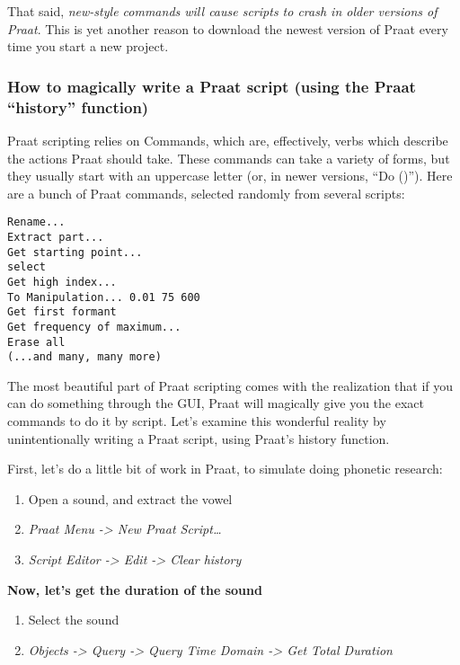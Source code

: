 \documentclass[11pt]{article}
\def\tightlist{}
\begin{document}
That said, \emph{new-style commands will cause scripts to crash in older
versions of Praat}. This is yet another reason to download the newest
version of Praat every time you start a new project.

\hypertarget{how-to-magically-write-a-praat-script-using-the-praat-history-function}{%
\subsubsection{How to magically write a Praat script (using the Praat
``history''
function)}\label{how-to-magically-write-a-praat-script-using-the-praat-history-function}}

Praat scripting relies on Commands, which are, effectively, verbs which
describe the actions Praat should take. These commands can take a
variety of forms, but they usually start with an uppercase letter (or,
in newer versions, ``Do ()''). Here are a bunch of Praat commands,
selected randomly from several scripts:

\begin{verbatim} 
Rename...
Extract part...
Get starting point...
select
Get high index...
To Manipulation... 0.01 75 600
Get first formant
Get frequency of maximum...
Erase all
(...and many, many more)
\end{verbatim}

The most beautiful part of Praat scripting comes with the realization
that if you can do something through the GUI, Praat will magically give
you the exact commands to do it by script. Let's examine this wonderful
reality by unintentionally writing a Praat script, using Praat's history
function.

First, let's do a little bit of work in Praat, to simulate doing
phonetic research:

\begin{enumerate}
\def\labelenumi{\arabic{enumi}.}
\tightlist
\item
  Open a sound, and extract the vowel
\item
  \emph{Praat Menu -\textgreater{} New Praat Script\ldots{}}
\item
  \emph{Script Editor -\textgreater{} Edit -\textgreater{} Clear
  history}
\end{enumerate}

\textbf{Now, let's get the duration of the sound}

\begin{enumerate}
\def\labelenumi{\arabic{enumi}.}
\setcounter{enumi}{3}
\tightlist
\item
  Select the sound
\item
  \emph{Objects -\textgreater{} Query -\textgreater{} Query Time Domain
  -\textgreater{} Get Total Duration}
\end{enumerate}
\end{document}
